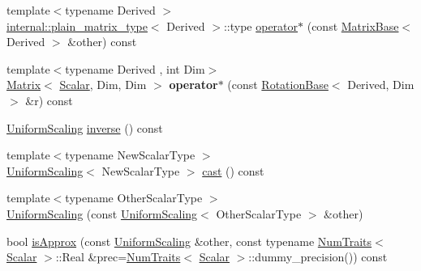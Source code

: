 \begin{DoxyCompactItemize}
\item 
{\footnotesize template$<$typename Derived $>$ }\\\hyperlink{struct_eigen_1_1internal_1_1plain__matrix__type}{internal\+::plain\+\_\+matrix\+\_\+type}$<$ Derived $>$\+::type \hyperlink{class_eigen_1_1_uniform_scaling_a1caa980503c4bba685aa65b419cad64b}{operator$\ast$} (const \hyperlink{group___core___module_class_eigen_1_1_matrix_base}{Matrix\+Base}$<$ Derived $>$ \&other) const
\item 
\mbox{\label{class_eigen_1_1_uniform_scaling_a991e1de828f897a9d6f706fe9d129387}} 
{\footnotesize template$<$typename Derived , int Dim$>$ }\\\hyperlink{group___core___module_class_eigen_1_1_matrix}{Matrix}$<$ \hyperlink{class_eigen_1_1_uniform_scaling_a04c4339f58f1210c5d4d34b1bd7ae283}{Scalar}, Dim, Dim $>$ {\bfseries operator$\ast$} (const \hyperlink{class_eigen_1_1_rotation_base}{Rotation\+Base}$<$ Derived, Dim $>$ \&r) const
\item 
\hyperlink{class_eigen_1_1_uniform_scaling}{Uniform\+Scaling} \hyperlink{class_eigen_1_1_uniform_scaling_a60dba22bebe9e2c97cfbc76f85eb1b78}{inverse} () const
\item 
{\footnotesize template$<$typename New\+Scalar\+Type $>$ }\\\hyperlink{class_eigen_1_1_uniform_scaling}{Uniform\+Scaling}$<$ New\+Scalar\+Type $>$ \hyperlink{class_eigen_1_1_uniform_scaling_af93a9ee1d6efc102b65a197f3ea3d4cd}{cast} () const
\item 
{\footnotesize template$<$typename Other\+Scalar\+Type $>$ }\\\hyperlink{class_eigen_1_1_uniform_scaling_a898cc0c97625ce671d7ea951f6eb2fc4}{Uniform\+Scaling} (const \hyperlink{class_eigen_1_1_uniform_scaling}{Uniform\+Scaling}$<$ Other\+Scalar\+Type $>$ \&other)
\item 
bool \hyperlink{class_eigen_1_1_uniform_scaling_a7f736fdbe43f7bce3d277312efdc315e}{is\+Approx} (const \hyperlink{class_eigen_1_1_uniform_scaling}{Uniform\+Scaling} \&other, const typename \hyperlink{group___core___module_struct_eigen_1_1_num_traits}{Num\+Traits}$<$ \hyperlink{class_eigen_1_1_uniform_scaling_a04c4339f58f1210c5d4d34b1bd7ae283}{Scalar} $>$\+::Real \&prec=\hyperlink{group___core___module_struct_eigen_1_1_num_traits}{Num\+Traits}$<$ \hyperlink{class_eigen_1_1_uniform_scaling_a04c4339f58f1210c5d4d34b1bd7ae283}{Scalar} $>$\+::dummy\+\_\+precision()) const
\end{DoxyCompactItemize}
